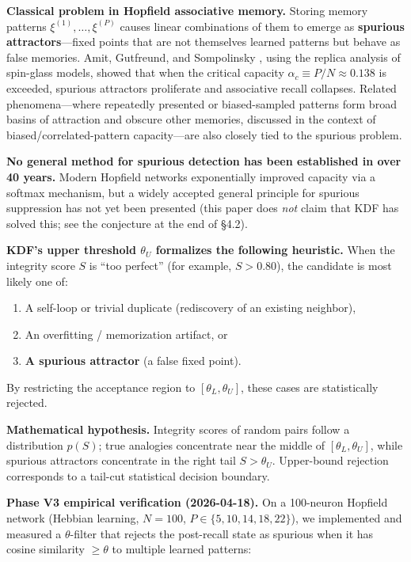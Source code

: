 \textbf{Classical problem in Hopfield associative memory.} Storing memory patterns \(\xi^{(1)}, \ldots, \xi^{(P)}\) causes linear combinations of them to emerge as \textbf{spurious attractors}---fixed points that are not themselves learned patterns but behave as false memories. Amit, Gutfreund, and Sompolinsky \citep{amit1987replica}, using the replica analysis of spin-glass models, showed that when the critical capacity \(\alpha_c \equiv P/N \approx 0.138\) is exceeded, spurious attractors proliferate and associative recall collapses. Related phenomena---where repeatedly presented or biased-sampled patterns form broad basins of attraction and obscure other memories, discussed in the context of biased/correlated-pattern capacity---are also closely tied to the spurious problem.

\textbf{No general method for spurious detection has been established in over 40 years.} Modern Hopfield networks \citep{ramsauer2021hopfield} exponentially improved capacity via a softmax mechanism, but a widely accepted general principle for spurious suppression has not yet been presented (this paper does \emph{not} claim that KDF has solved this; see the conjecture at the end of §4.2).

\textbf{KDF's upper threshold \(\theta_U\) formalizes the following heuristic.} When the integrity score \(S\) is ``too perfect'' (for example, \(S > 0.80\)), the candidate is most likely one of:

\begin{enumerate}
\def\labelenumi{\arabic{enumi}.}
\tightlist
\item
  A self-loop or trivial duplicate (rediscovery of an existing neighbor),
\item
  An overfitting / memorization artifact, or
\item
  \textbf{A spurious attractor} (a false fixed point).
\end{enumerate}

By restricting the acceptance region to \([\theta_L, \theta_U]\), these cases are statistically rejected.

\textbf{Mathematical hypothesis.} Integrity scores of random pairs follow a distribution \(p(S)\); true analogies concentrate near the middle of \([\theta_L, \theta_U]\), while spurious attractors concentrate in the right tail \(S > \theta_U\). Upper-bound rejection corresponds to a tail-cut statistical decision boundary.

\textbf{Phase V3 empirical verification (2026-04-18).} On a 100-neuron Hopfield network (Hebbian learning, \(N = 100\), \(P \in \{5, 10, 14, 18, 22\}\)), we implemented and measured a \(\theta\)-filter that rejects the post-recall state as spurious when it has cosine similarity \(\ge \theta\) to multiple learned patterns:

